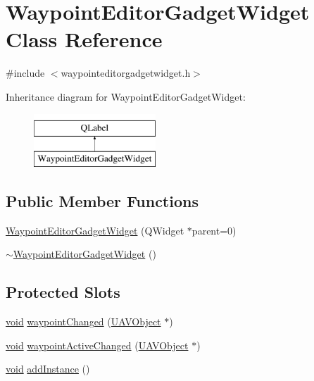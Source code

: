 \hypertarget{class_waypoint_editor_gadget_widget}{\section{Waypoint\-Editor\-Gadget\-Widget Class Reference}
\label{class_waypoint_editor_gadget_widget}
}


{\ttfamily \#include $<$waypointeditorgadgetwidget.\-h$>$}

Inheritance diagram for Waypoint\-Editor\-Gadget\-Widget\-:\begin{figure}[H]
\begin{center}
\leavevmode
\includegraphics[height=2.000000cm]{class_waypoint_editor_gadget_widget}
\end{center}
\end{figure}
\subsection*{Public Member Functions}
\begin{DoxyCompactItemize}
\item 
\hyperlink{group___waypoint_editor_gadget_plugin_gaed1892bdb06fd69b9efd71f0490b6865}{Waypoint\-Editor\-Gadget\-Widget} (Q\-Widget $\ast$parent=0)
\item 
\hyperlink{group___waypoint_editor_gadget_plugin_ga6384204fc4ea3baac3ef034bec3ffd2e}{$\sim$\-Waypoint\-Editor\-Gadget\-Widget} ()
\end{DoxyCompactItemize}
\subsection*{Protected Slots}
\begin{DoxyCompactItemize}
\item 
\hyperlink{group___u_a_v_objects_plugin_ga444cf2ff3f0ecbe028adce838d373f5c}{void} \hyperlink{group___waypoint_editor_gadget_plugin_gaf94d2aa5249b20561783e93b04428875}{waypoint\-Changed} (\hyperlink{class_u_a_v_object}{U\-A\-V\-Object} $\ast$)
\item 
\hyperlink{group___u_a_v_objects_plugin_ga444cf2ff3f0ecbe028adce838d373f5c}{void} \hyperlink{group___waypoint_editor_gadget_plugin_ga3f3ab4714a439f9a90e34a03506a4f38}{waypoint\-Active\-Changed} (\hyperlink{class_u_a_v_object}{U\-A\-V\-Object} $\ast$)
\item 
\hyperlink{group___u_a_v_objects_plugin_ga444cf2ff3f0ecbe028adce838d373f5c}{void} \hyperlink{group___waypoint_editor_gadget_plugin_ga1cdc4fa0f69ba28ea67dc549588c0cf6}{add\-Instance} ()
\end{DoxyCompactItemize}


